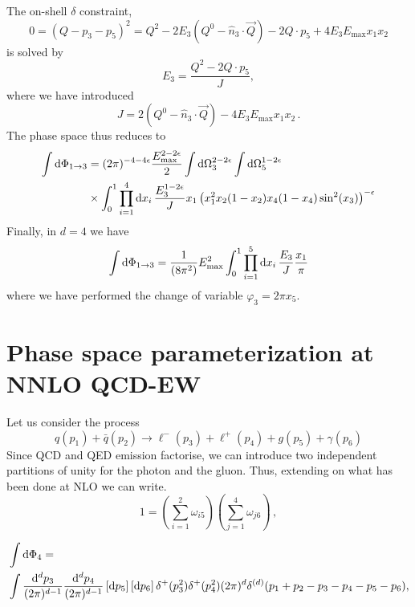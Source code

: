 \documentclass[a4paper,11pt]{article}
\begin{document}
The on-shell $\delta$ constraint,
\begin{equation}
0 = (Q-p_3-p_5)^2 = Q^2 - 2 E_3(Q^0 - \hat{n}_3\cdot \vec{Q}) - 2 Q\cdot p_5 + 4 E_3 E_{\max} x_1 x_2
\end{equation}
is solved by
\begin{equation}
E_3 = \frac{Q^2 - 2 Q\cdot p_5}{J},
\end{equation}
where we have introduced 
\begin{equation}
J = 2(Q^0 - \hat{n}_3\cdot \vec{Q}) - 4 E_3 E_{\max} x_1 x_2\, .
\end{equation}
The phase space thus reduces to
\begin{align}
\int \rd\Phi_{1\to 3} &= 
(2\pi)^{-4-4\epsilon}\frac{E_{\max}^{2-2\epsilon}}{2}
\int \rd\Omega^{2-2\epsilon}_{3}
\int \rd\Omega^{1-2\epsilon}_{5} \nonumber \\
%
& \times \int^{1}_0 \prod_{i=1}^4 \rd x_i\,
\frac{E^{1-2\epsilon}_{3}}{J} x_1 
\left(x_1^2 x_2 (1-x_2) x_4 (1-x_4) \sin^2(x_3) \right)^{-\epsilon}
\end{align}
Finally, in $d=4$ we have
\begin{equation}
\int \mathrm d\Phi_{1\to 3} = \frac{1}{(8\pi^2)}
E_{\max}^{2}
\int^{1}_0 \prod_{i=1}^5 \mathrm d x_i\,
\frac{E_{3}}{J} \frac{x_1}{\pi}
\end{equation}
where we have performed the change of variable $\varphi_3 = 2\pi x_5$.
%
%
\section{Phase space parameterization at NNLO QCD-EW}
\label{se:NNLOMIXparam}
Let us consider the process
\begin{equation}
q(p_1) + \bar{q}(p_2) \to \ell^-(p_3) + \ell^+(p_4) + 
g(p_5) + \gamma(p_6)
\end{equation}
Since QCD and QED emission factorise, we can introduce two independent
partitions of unity for the photon and the gluon. 
Thus, extending on what has been done at NLO we can write.
\begin{equation}
1 = \left(\sum_{i=1}^2 \omega_{i5}\right) 
\left(\sum_{j=1}^4 \omega_{j6}\right)\, ,
\end{equation}

\begin{align}
& \int \mathrm d\Phi_{4} = \nonumber \\ 
& \int \frac{\mathrm d^d p_3}{(2\pi)^{d-1}} \frac{\mathrm d^d p_4}{(2\pi)^{d-1}}
\left[\mathrm d p_5\right]\left[\mathrm d p_6\right]
\delta^{+}(p^2_3) \delta^{+}(p^2_4) (2\pi)^d \delta^{(d)}(p_1 + p_2 -p_3-p_4-p_5-p_6),
\end{align}
\end{document}
